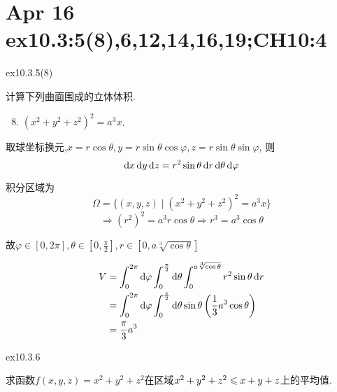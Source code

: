 \section{Apr 16 ex10.3:5(8),6,12,14,16,19;CH10:4}

\begin{exercise}
    {ex10.3.5(8)}

    计算下列曲面围成的立体体积.
    \begin{enumerate}
        \setcounter{enumi}{7}
        \item $(x^2+y^2+z^2)^2 = a^3 x$.
    \end{enumerate}
\end{exercise}

\begin{solution}
    取球坐标换元,$x = r \cos \theta, y = r \sin \theta \cos \varphi, z = r \sin \theta \sin \varphi$,
    则$$\operatorname{d\!} x \operatorname{d\!} y \operatorname{d\!} z = r^2 \sin \theta \operatorname{d\!} r \operatorname{d\!} \theta \operatorname{d\!} \varphi$$

    积分区域为$$\Omega = \{ (x,y,z) \mid (x^2+y^2+z^2)^2 = a^3 x \}$$
    $$\Rightarrow (r^2)^2 = a^3 r \cos \theta \Rightarrow r^3 = a^3 \cos \theta$$

    故$\varphi \in [0, 2 \pi], \theta \in [0, \frac{\pi}{2}], r \in [0, a \sqrt[3]{\cos \theta}]$

    \begin{align*}
        V &= \int_0^{2\pi} \operatorname{d\!} \varphi \int_0^{\frac{\pi}{2}} \operatorname{d\!} \theta \int_0^{a \sqrt[3]{\cos \theta}} r^2 \sin \theta \operatorname{d\!} r \\
        &= \int_0^{2 \pi} \operatorname{d\!} \varphi \int_0^{\frac{\pi}{2}} \operatorname{d\!} \theta \sin \theta \left( \frac{1}{3} a^3 \cos \theta \right) \\
        &= \frac{\pi}{3} a^3
    \end{align*}
\end{solution}



\begin{exercise}
{ex10.3.6}

    求函数$f(x,y,z) = x^2 + y^2 + z^2$在区域$x^2 + y^2 + z^2 \leqslant x + y + z$上的平均值.
\end{exercise}

